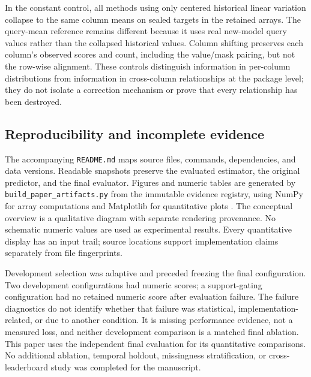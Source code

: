 \documentclass{article}
\begin{document}
In the constant control, all methods using only centered historical linear variation collapse to the same column means on sealed targets in the retained arrays. The query-mean reference remains different because it uses real new-model query values rather than the collapsed historical values. Column shifting preserves each column's observed scores and count, including the value/mask pairing, but not the row-wise alignment. These controls distinguish information in per-column distributions from information in cross-column relationships at the package level; they do not isolate a correction mechanism or prove that every relationship has been destroyed.

\subsection{Reproducibility and incomplete evidence}
The accompanying \texttt{README.md} maps source files, commands, dependencies, and data versions. Readable snapshots preserve the evaluated estimator, the original predictor, and the final evaluator. Figures and numeric tables are generated by \texttt{build\_paper\_artifacts.py} from the immutable evidence registry, using NumPy for array computations and Matplotlib for quantitative plots \citep{Harris2020,Hunter2007}. The conceptual overview is a qualitative diagram with separate rendering provenance. No schematic numeric values are used as experimental results. Every quantitative display has an input trail; source locations support implementation claims separately from file fingerprints.

Development selection was adaptive and preceded freezing the final configuration. Two development configurations had numeric scores; a support-gating configuration had no retained numeric score after evaluation failure. The failure diagnostics do not identify whether that failure was statistical, implementation-related, or due to another condition. It is missing performance evidence, not a measured loss, and neither development comparison is a matched final ablation. This paper uses the independent final evaluation for its quantitative comparisons. No additional ablation, temporal holdout, missingness stratification, or cross-leaderboard study was completed for the manuscript.
\end{document}
